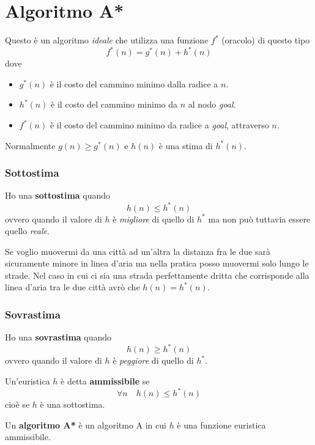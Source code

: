 \section{Algoritmo A*}
Questo \`e un algoritmo \emph{ideale} che utilizza una funzione $f^*$ (oracolo) di questo
tipo \[ f^*(n) = g^*(n) + h^*(n) \] dove
\begin{itemize}
	\item $g^*(n)$ \`e il costo del cammino minimo dalla radice a $n$.
	\item $h^*(n)$ \`e il costo del cammino minimo da $n$ al nodo \emph{goal}.
	\item $f^*(n)$ \`e il costo del cammino minimo da radice a \emph{goal}, attraverso $n$.
\end{itemize}
Normalmente $g(n) \geq g^*(n)$ e $h(n)$ \`e una stima di $h^*(n)$.

\subsubsection{Sottostima}
Ho una \textbf{sottostima} quando \[ h(n) \leq h^*(n) \] ovvero quando il valore di $h$ \`e
\emph{migliore} di quello di $h^*$ ma non pu\`o tuttavia essere quello \emph{reale}.

\begin{example}
	Se voglio muovermi da una citt\`a ad un'altra la distanza fra le due sar\`a sicuramente
	minore in linea d'aria ma nella pratica posso muovermi solo lungo le strade. Nel caso
	in cui ci sia una strada perfettamente dritta che corrisponde alla linea d'aria tra le
	due citt\`a avr\`o che $h(n) = h^*(n)$.
\end{example}

\subsubsection{Sovrastima}
Ho una \textbf{sovrastima} quando \[ h(n) \geq h^*(n) \] ovvero quando il valore di $h$ \`e
\emph{peggiore} di quello di $h^*$.

\begin{definition}
	Un'euristica $h$ \`e detta \textbf{ammissibile} se
	\[ \forall n \quad h(n) \leq h^*(n) \]
	cio\`e se $h$ \`e una sottostima.
\end{definition}

\begin{definition}
	Un \textbf{algoritmo A*} \`e un algoritmo A in cui $h$ \`e una funzione euristica
	ammissibile.
\end{definition}

